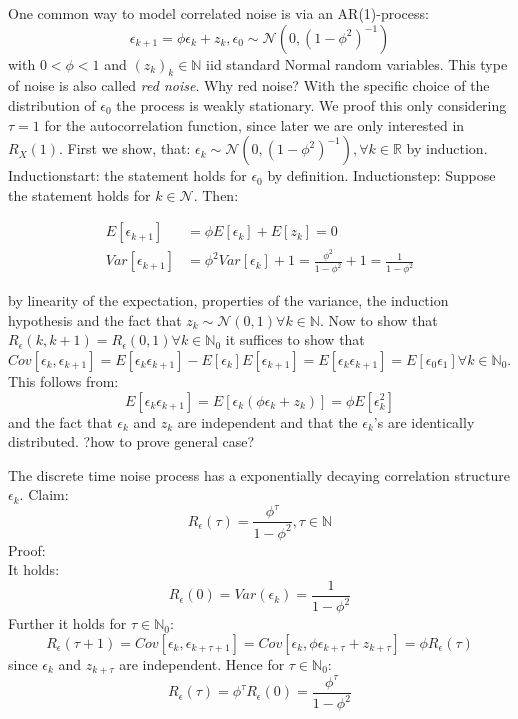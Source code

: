 \documentclass[%
thesis=student,%
coverpage=false,%
titlepage=false,%
headmarks=true, %
german,%
font=libertine, %
math=newpxtx, %
BCOR=5mm,%
coverBCOR=11mm%
]{tumbook}
\begin{document}
One common way to model correlated noise is via an AR(1)-process:
\[
\epsilon_{k+1} = \phi\epsilon_{k} + z_{k}, \epsilon_{0} \sim \mathcal{N}(0,(1-\phi^2)^{-1})
\]
with $0<\phi<1$ and $(z_{k})_{k}\in\mathbb{N}$ iid standard Normal random variables. This type of noise is also called \textit{red noise}. Why red noise? With the specific choice of the distribution of $\epsilon_{0}$ the process is weakly stationary. We proof this only considering $\tau = 1$ for the autocorrelation function, since later we are only interested in $R_{X}(1)$. First we show, that: $\epsilon_{k} \sim \mathcal{N}(0,(1-\phi^2)^{-1}), \forall k \in \mathbb{R}$ by induction. Inductionstart: the statement holds for $\epsilon_{0}$ by definition.
Inductionstep: Suppose the statement holds for $k \in \mathcal{N}$. Then:

\begin{subequations}
    \begin{align}
        E[\epsilon_{k+1}] &= \phi E[\epsilon_{k}] + E[z_{k}]  = 0 \\
        Var[\epsilon_{k+1}] &= \phi^2 Var[\epsilon_{k}] + 1 = \frac{\phi^2}{1-\phi^2} + 1 = \frac{1}{1-\phi^2}     
    \end{align}
\end{subequations}   

by linearity of the expectation, properties of the variance, the induction hypothesis and the fact that $z_{k} \sim \mathcal{N}(0,1) \forall k \in \mathbb{N}$. Now to show that $R_{\epsilon}(k,k+1) = R_{\epsilon}(0,1) \forall k \in \mathbb{N}_{0}$ it suffices to show that $Cov[\epsilon_{k},\epsilon_{k+1}] = E[\epsilon_{k}\epsilon_{k+1}] - E[\epsilon_{k}]E[\epsilon_{k+1}] = E[\epsilon_{k}\epsilon_{k+1}] = E[\epsilon_{0}\epsilon_{1}] \forall k \in \mathbb{N}_{0}$. This follows from: 
\[
E[\epsilon_{k}\epsilon_{k+1}] = E[\epsilon_{k}(\phi\epsilon_{k} + z_{k})] = \phi E[\epsilon_{k}^2]
\]
and the fact that $\epsilon_{k}$ and $z_{k}$ are independent and that the $\epsilon_{k}$'s are identically distributed. ?how to prove general case?

The discrete time noise process has a exponentially decaying correlation structure $\epsilon_{k}$. Claim:
\[
R_{\epsilon}(\tau) = \frac{\phi^{\tau}}{1-\phi^{2}}, \tau \in \mathbb{N}
\]
Proof: \\
It holds: 
\[
R_{\epsilon}(0)= Var(\epsilon_{k}) = \frac{1}{1-\phi^{2}}
\]
Further it holds for $\tau \in \mathbb{N}_{0}$:
\[
R_{\epsilon}(\tau+1) = Cov[\epsilon_{k},\epsilon_{k+\tau + 1}] = Cov[\epsilon_{k},\phi\epsilon_{k+\tau}+z_{k+\tau}] = \phi R_{\epsilon}(\tau)
\]
since $\epsilon_{k}$ and $z_{k+\tau}$ are independent. Hence for $\tau \in \mathbb{N}_{0}$:
\[
R_{\epsilon}(\tau) = \phi^{\tau}R_{\epsilon}(0)=\frac{\phi^{\tau}}{1-\phi^{2}}
\]
\end{document}
